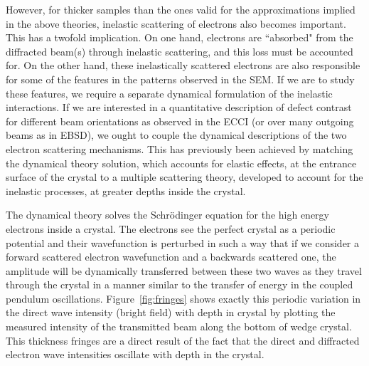 However, for thicker samples than the ones valid for the approximations implied in the above theories, inelastic scattering of electrons also becomes important. This has a twofold implication. On one hand, electrons are ``absorbed" from the diffracted beam(s) through inelastic scattering, and this loss must be accounted for. On the other hand, these inelastically scattered electrons are also responsible for some of the features in the patterns observed in the SEM. If we are to study these features, we require a separate dynamical formulation of the inelastic interactions. If we are interested in a quantitative description of defect contrast for different beam orientations as observed in the ECCI (or over many outgoing beams as in EBSD), we ought to couple the dynamical descriptions of the two electron scattering mechanisms. This has previously been achieved by matching the dynamical theory solution, which accounts for elastic effects, at the entrance surface of the crystal to a multiple scattering theory, developed to account for the inelastic processes, at greater depths inside the crystal\cite{Baines73,Howie78}.

The dynamical theory solves the Schr\"{o}dinger equation for the high energy electrons inside a crystal. The electrons see the perfect crystal as a periodic potential and their wavefunction is perturbed in such a way that if we consider a forward scattered electron wavefunction and a backwards scattered one, the amplitude will be dynamically transferred between these two waves as they travel through the crystal in a manner similar to the transfer of energy in the coupled pendulum oscillations. Figure~\ref{fig:fringes} shows exactly this periodic variation in the direct wave intensity (bright field) with depth in crystal by plotting the measured intensity of the transmitted beam along the bottom of wedge crystal. This thickness fringes are a direct result of the fact that the direct and diffracted electron wave intensities oscillate with depth in the crystal.



